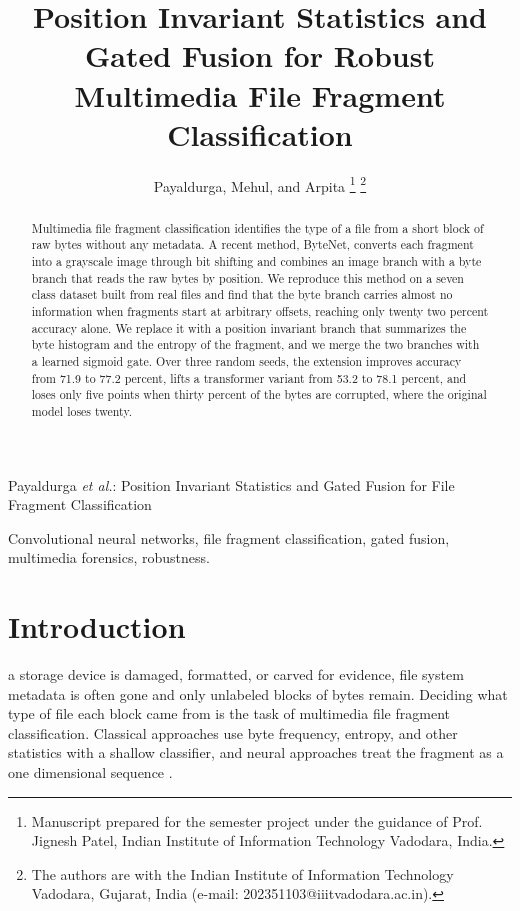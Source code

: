 \documentclass[journal]{IEEEtran}
\begin{document}
\title{Position Invariant Statistics and Gated Fusion for Robust Multimedia File Fragment Classification}

\author{Payaldurga, Mehul, and Arpita
\thanks{Manuscript prepared for the semester project under the guidance of Prof. Jignesh Patel, Indian Institute of Information Technology Vadodara, India.}
\thanks{The authors are with the Indian Institute of Information Technology Vadodara, Gujarat, India (e-mail: 202351103@iiitvadodara.ac.in).}}

{Payaldurga \MakeLowercase{\textit{et al.}}: Position Invariant Statistics and Gated Fusion for File Fragment Classification}

\maketitle

\begin{abstract}
Multimedia file fragment classification identifies the type of a file from a short block of raw bytes without any metadata. A recent method, ByteNet, converts each fragment into a grayscale image through bit shifting and combines an image branch with a byte branch that reads the raw bytes by position. We reproduce this method on a seven class dataset built from real files and find that the byte branch carries almost no information when fragments start at arbitrary offsets, reaching only twenty two percent accuracy alone. We replace it with a position invariant branch that summarizes the byte histogram and the entropy of the fragment, and we merge the two branches with a learned sigmoid gate. Over three random seeds, the extension improves accuracy from 71.9 to 77.2 percent, lifts a transformer variant from 53.2 to 78.1 percent, and loses only five points when thirty percent of the bytes are corrupted, where the original model loses twenty.
\end{abstract}

\begin{IEEEkeywords}
Convolutional neural networks, file fragment classification, gated fusion, multimedia forensics, robustness.
\end{IEEEkeywords}

\IEEEpeerreviewmaketitle

\section{Introduction}
 a storage device is damaged, formatted, or carved for evidence, file system metadata is often gone and only unlabeled blocks of bytes remain. Deciding what type of file each block came from is the task of multimedia file fragment classification. Classical approaches use byte frequency, entropy, and other statistics with a shallow classifier, and neural approaches treat the fragment as a one dimensional sequence \cite{bytenet}.
\end{document}
